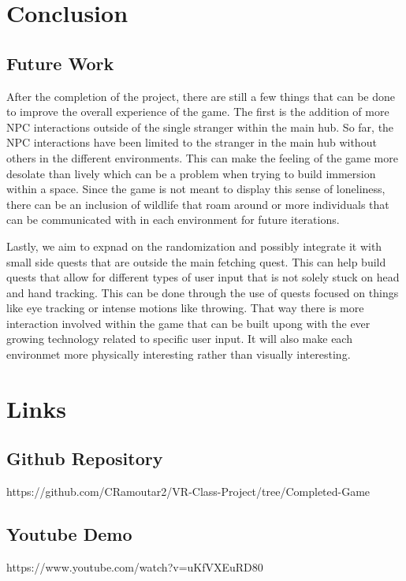 \documentclass{vgtc}                          %
\begin{document}
\section{Conclusion}
\subsection*{Future Work}
After the completion of the project, there are still a few things that can be done to improve the overall experience of the game. The first is the addition of more NPC interactions outside of the single stranger within the main hub. So far, the NPC interactions have been limited to the stranger in the main hub without others in the different environments. This can make the feeling of the game more desolate than lively
which can be a problem when trying to build immersion within a space. Since the game is not meant to display this sense of loneliness, there can be an inclusion of wildlife that roam around or more individuals that can be communicated with in each environment for future iterations.

Lastly, we aim to expnad on the randomization and possibly integrate it with small side quests that are outside the main fetching quest. This can help build quests that allow for different types of user input that is not solely stuck on head and hand tracking. This can be done through the use of quests focused on things like eye tracking or intense motions like throwing. That way there is more interaction involved within
the game that can be built upong with the ever growing technology related to specific user input. It will also make each environmet more physically interesting rather than visually interesting.

\section* {Links}
\subsection* {Github Repository}
https://github.com/CRamoutar2/VR-Class-Project/tree/Completed-Game
\subsection*{Youtube Demo}
https://www.youtube.com/watch?v=uKfVXEuRD80

%

%
%
%


\end{document}
